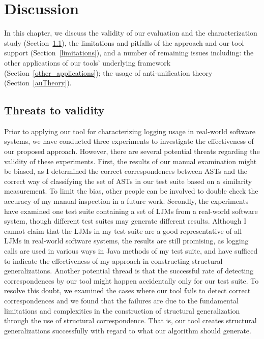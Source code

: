 \chapter{Discussion}  \label{diss}

In this chapter, we discuss the validity of our evaluation and the characterization study (Section~\ref{threads}), the limitations and pitfalls of the approach and our tool support (Section~\ref{limitations}), and a number of remaining issues including: the other applications of our tools' underlying framework (Section~\ref{other_applications}); the usage of anti-unification theory (Section~\ref{auTheory}).

\section{Threats to validity}  \label{threads}
Prior to applying our tool for characterizing logging usage in real-world software systems, we have conducted three experiments to investigate the effectiveness of our proposed approach. However, there are several potential threats regarding the validity of these experiments. First, the results of our manual examination might be biased, as I determined the correct correspondences between ASTs and the correct way of classifying the set of ASTs in our test suite based on a similarity measurement. To limit the bias, other people can be involved to double check the accuracy of my manual inspection in a future work. Secondly, the experiments have examined one test suite containing a set of LJMs from a real-world software system, though different test suites may generate different results. Although I cannot claim that the LJMs in my test suite are a good representative of all LJMs in real-world software systems, the results are still promising, as logging calls are used in various ways in Java methods of my test suite, and have sufficed to indicate the effectiveness of my approach in constructing structural generalizations. Another potential thread is that the successful rate of detecting correspondences by our tool might happen accidentally only for our test suite. To resolve this doubt, we examined the cases where our tool fails to detect correct correspondences and we found that the failures are due to the fundamental limitations and complexities in the construction of structural generalization through the use of structural correspondence. That is, our tool creates structural generalizations successfully with regard to what our algorithm should generate.
